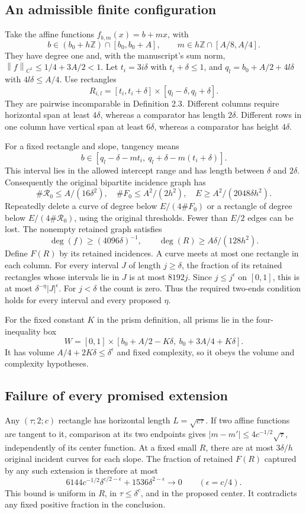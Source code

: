 \documentclass[10pt]{article}
\begin{document}
\subsection*{An admissible finite configuration}
Take the affine functions \(f_{b,m}(x)=b+mx\), with \[b\in(b_0+h\mathbb Z)\cap[b_0,b_0+A],\qquad
 m\in h\mathbb Z\cap[A/8,A/4].\] They have degree one and, with the manuscript’s sum norm, \(\left\|f\right\|_{C^1}\le1/4+3A/2<1\). Let \(t_i=3i\delta\) with \(t_i+\delta\le1\), and \(q_l=b_0+A/2+4l\delta\) with \(4l\delta\le A/4\). Use rectangles \[R_{i,l}=[t_i,t_i+\delta]\times[q_l-\delta,q_l+\delta].\] They are pairwise incomparable in Definition 2.3. Different columns require horizontal span at least \(4\delta\), whereas a comparator has length \(2\delta\). Different rows in one column have vertical span at least \(6\delta\), whereas a comparator has height \(4\delta\).\par
For a fixed rectangle and slope, tangency means \[b\in[q_l-\delta-mt_i,\ q_l+\delta-m(t_i+\delta)].\] This interval lies in the allowed intercept range and has length between \(\delta\) and \(2\delta\). Consequently the original bipartite incidence graph has \[\#\mathcal R_0\le A/(16\delta^2),\quad
 \#F_0\le A^2/(2h^2),\quad
 E\ge A^2/(2048\delta h^2).\] Repeatedly delete a curve of degree below \(E/(4\#F_0)\) or a rectangle of degree below \(E/(4\#\mathcal R_0)\), using the original thresholds. Fewer than \(E/2\) edges can be lost. The nonempty retained graph satisfies \[\deg(f)\ge(4096\delta)^{-1},\qquad
 \deg(R)\ge A\delta/(128h^2).\] Define \(F(R)\) by its retained incidences. A curve meets at most one rectangle in each column. For every interval \(J\) of length \(j\ge\delta\), the fraction of its retained rectangles whose intervals lie in \(J\) is at most \(8192j\). Since \(j\le j^\epsilon\) on \([0,1]\), this is at most \(\delta^{-\eta}|J|^\epsilon\). For \(j<\delta\) the count is zero. Thus the required two-ends condition holds for every interval and every proposed \(\eta\).\par
For the fixed constant \(K\) in the prism definition, all prisms lie in the four-inequality box \[W=[0,1]\times[b_0+A/2-K\delta,\ b_0+3A/4+K\delta].\] It has volume \(A/4+2K\delta\le\delta^\epsilon\) and fixed complexity, so it obeys the volume and complexity hypotheses.\par
\subsection*{Failure of every promised extension}
Any \((\tau;2;c)\) rectangle has horizontal length \(L=\sqrt{c\tau}\). If two affine functions are tangent to it, comparison at its two endpoints gives \(\left|m-m'\right|\le4c^{-1/2}\sqrt{\tau}\), independently of its center function. At a fixed small \(R\), there are at most \(3\delta/h\) original incident curves for each slope. The fraction of retained \(F(R)\) captured by any such extension is therefore at most \[6144c^{-1/2}\delta^{c/2-\epsilon}
       +1536\delta^{2-\epsilon}
 \longrightarrow0
 \qquad(\epsilon=c/4).
 \tag{2.1}\] This bound is uniform in \(R\), in \(\tau\le\delta^c\), and in the proposed center. It contradicts any fixed positive fraction in the conclusion.\par
\end{document}
